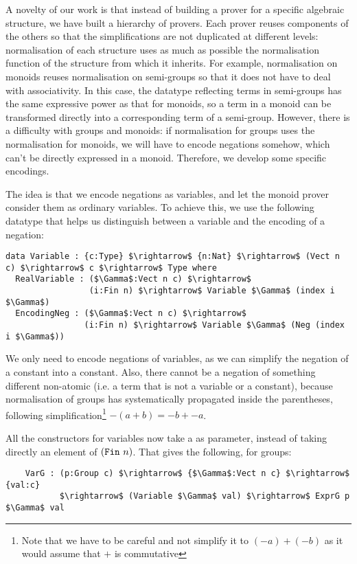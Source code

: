 A novelty of our work is that instead of building a prover for a
specific algebraic structure, we have built a hierarchy of provers.
Each prover reuses components
of the others so that
the simplifications are not duplicated at different
levels: normalisation of each structure uses as much as possible
the normalisation function of the structure from which it inherits. For
example, normalisation on monoids reuses normalisation on semi-groups
so that it does not have to deal with associativity. In this
case, the datatype reflecting terms in semi-groups has
the same expressive power as that for monoids, so a term in a monoid can
be transformed directly into a corresponding term of a semi-group. However, 
there is a difficulty with
groups and monoids: if normalisation for groups
uses the normalisation for monoids, 
we will have to encode 
negations somehow, which can't be directly expressed in a monoid.
Therefore, we develop some specific encodings.

The idea is that we encode negations as variables, and let the
monoid prover consider them as ordinary variables. To achieve this,
we use the following datatype that helps us distinguish between a
variable and the encoding of a negation:

\begin{lstlisting}
data Variable : {c:Type} $\rightarrow$ {n:Nat} $\rightarrow$ (Vect n c) $\rightarrow$ c $\rightarrow$ Type where
  RealVariable : ($\Gamma$:Vect n c) $\rightarrow$ 
                 (i:Fin n) $\rightarrow$ Variable $\Gamma$ (index i $\Gamma$)
  EncodingNeg : ($\Gamma$:Vect n c) $\rightarrow$ 
                (i:Fin n) $\rightarrow$ Variable $\Gamma$ (Neg (index i $\Gamma$))
\end{lstlisting}

We only need to encode negations of variables, as we can simplify 
the negation of a constant into a constant.
Also, there cannot be a negation of something
different non-atomic (i.e. a term that is not a variable or a constant), because normalisation 
of
groups has systematically propagated  inside the parentheses,
following simplification\footnote{Note that we have to be careful and not
simplify it to $(-a) + (-b)$ as it would assume that $+$ is commutative}
$-(a+b) = -b + -a$.

All the constructors for variables now take a  as parameter,
instead of taking directly an element of $(\code{Fin}\ n)$. That gives the
following, for groups:

\begin{lstlisting}
    VarG : (p:Group c) $\rightarrow$ {$\Gamma$:Vect n c} $\rightarrow$ {val:c} 
           $\rightarrow$ (Variable $\Gamma$ val) $\rightarrow$ ExprG p $\Gamma$ val
\end{lstlisting}


